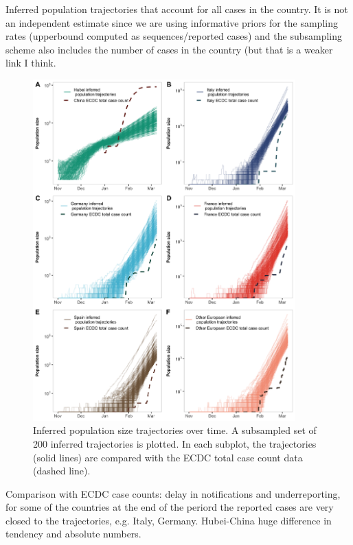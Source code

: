 \documentclass[12pt,]{article}
\begin{document}
Inferred population trajectories that account for all cases in the country. It is not an independent estimate since we are using informative priors for the sampling rates (upperbound computed as sequences/reported cases) and the subsampling scheme also includes the number of cases in the country (but that is a weaker link I think.\\

\begin{figure}[ht]
    \centering
    \includegraphics[width=0.9\textwidth]{201014_europe2_figtraj02.png}
    \caption{Inferred population size trajectories over time. A subsampled set of 200 inferred trajectories is plotted. In each subplot, the trajectories (solid lines) are compared with the ECDC total case count data (dashed line).}
    \label{fig:trajs}
\end{figure}

Comparison with ECDC case counts: delay in notifications and underreporting, for some of the  countries at the end of the periord the reported cases are very closed to the trajectories, e.g. Italy, Germany. Hubei-China huge difference in tendency and absolute numbers.\\ 
\end{document}
